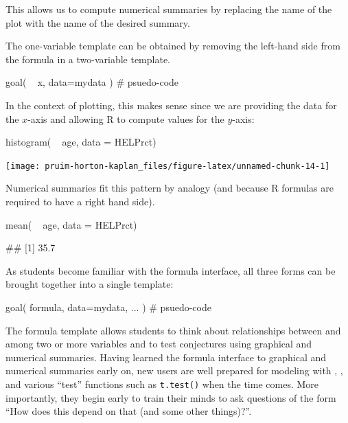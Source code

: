 \noindent
This allows us to compute numerical summaries by replacing the name of
the plot with the name of the desired summary.

The one-variable template can be obtained by removing the left-hand side
from the formula in a two-variable template.

\begin{Schunk}
\begin{Sinput}
goal( ~ x, data=mydata )               # psuedo-code
\end{Sinput}
\end{Schunk}

\noindent
In the context of plotting, this makes sense since we are providing the
data for the \(x\)-axis and allowing R to compute values for the
\(y\)-axis:

\begin{Schunk}
\begin{Sinput}
histogram( ~ age, data = HELPrct)
\end{Sinput}


\begin{center}\texttt{[image: pruim-horton-kaplan\_files/figure-latex/unnamed-chunk-14-1]} \end{center}

\end{Schunk}

\noindent
Numerical summaries fit this pattern by analogy (and because R formulas
are required to have a right hand side).

\begin{Schunk}
\begin{Sinput}
mean( ~ age, data = HELPrct)
\end{Sinput}
\begin{Soutput}
## [1] 35.7
\end{Soutput}
\end{Schunk}

As students become familiar with the formula interface, all three forms
can be brought together into a single template:

\begin{Schunk}
\begin{Sinput}
goal( formula, data=mydata, ... )      # psuedo-code
\end{Sinput}
\end{Schunk}

\noindent
The formula template allows students to think about relationships
between and among two or more variables and to test conjectures using
graphical and numerical summaries. Having learned the formula interface
to graphical and numerical summaries early on, new users are well
prepared for modeling with , , and various
``test'' functions such as \texttt{t.test()} when the time comes. More
importantly, they begin early to train their minds to ask questions of
the form ``How does this depend on that (and some other things)?''.

